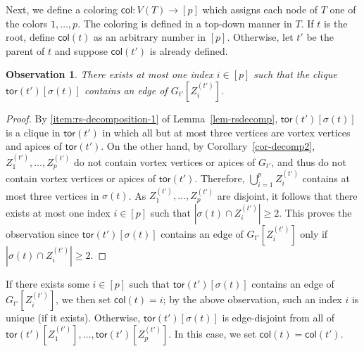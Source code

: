 \documentclass[a4paper,11pt]{article}
\numberwithin{lemma}{section}
\newtheorem{observation}[lemma]{Observation}
\newcommand{\tor}{\mathsf{tor}}
\begin{document}
Next, we define a coloring $\mathsf{col}\colon V(T) \rightarrow [p]$ which assigns each node of $T$ one of the colors $1,\dots,p$.
The coloring is defined in a top-down manner in $T$.
If $t$ is the root, define $\mathsf{col}(t)$ as an arbitrary number in $[p]$.
Otherwise, let $t'$ be the parent of $t$ and suppose $\mathsf{col}(t')$ is already defined.

\begin{observation}
There exists at most one index $i \in [p]$ such that the clique $\tor(t')[\sigma(t)]$ contains an edge of $G_{t'}[Z_i^{(t')}]$.
\end{observation}
\begin{proof}
By \ref{item:rs-decomposition-1} of Lemma~\ref{lem-rsdecomp}, $\tor(t')[\sigma(t)]$ is a clique in $\tor(t')$ in which all but at most three vertices are vortex vertices and apices of $\tor(t')$.
On the other hand, by Corollary~\ref{cor-decomp2}, $Z_1^{(t')},\dots,Z_p^{(t')}$ do not contain vortex vertices or apices of $G_{t'}$, and thus do not contain vortex vertices or apices of $\tor(t')$.
Therefore, $\bigcup_{i=1}^p Z_i^{(t')}$ contains at most three vertices in $\sigma(t)$.
As $Z_1^{(t')},\dots,Z_p^{(t')}$ are disjoint, it follows that there exists at most one index $i \in [p]$ such that $|\sigma(t) \cap Z_i^{(t')}| \geq 2$.
This proves the observation since $\tor(t')[\sigma(t)]$ contains an edge of $G_{t'}[Z_i^{(t')}]$ only if $|\sigma(t) \cap Z_i^{(t')}| \geq 2$.
\end{proof}
If there exists some $i \in [p]$ such that $\tor(t')[\sigma(t)]$ contains an edge of $G_{t'}[Z_i^{(t')}]$, we then set $\mathsf{col}(t) = i$; by the above observation, such an index $i$ is unique (if it exists).
Otherwise, $\tor(t')[\sigma(t)]$ is edge-disjoint from all of $\tor(t')[Z_1^{(t')}],\dots,\tor(t')[Z_p^{(t')}]$.
In this case, we set $\mathsf{col}(t) = \mathsf{col}(t')$.
\end{document}
